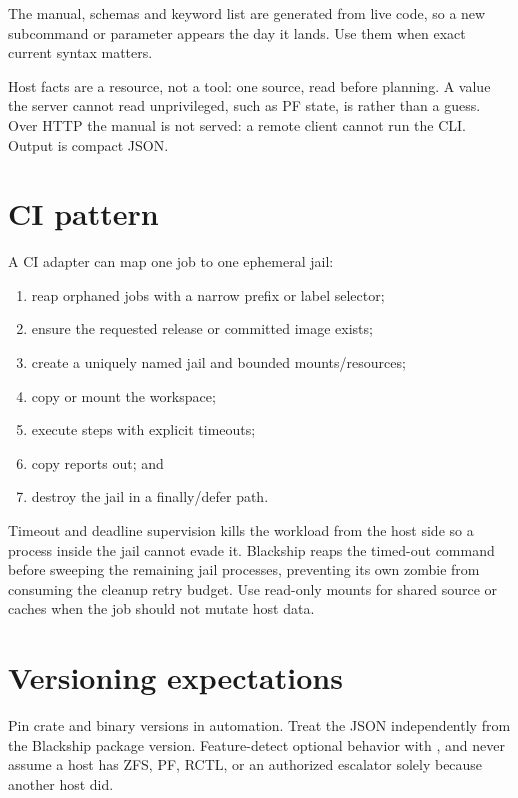 The manual, schemas and keyword list are generated from live code, so a new
subcommand or parameter appears the day it lands. Use them when exact current
syntax matters.

Host facts are a resource, not a tool: one source, read before planning. A
value the server cannot read unprivileged, such as PF state, is 
rather than a guess. Over HTTP the manual is not served: a remote client cannot
run the CLI. Output is compact JSON.

\section{CI pattern}

A CI adapter can map one job to one ephemeral jail:

\begin{enumerate}
  \item reap orphaned jobs with a narrow prefix or label selector;
  \item ensure the requested release or committed image exists;
  \item create a uniquely named jail and bounded mounts/resources;
  \item copy or mount the workspace;
  \item execute steps with explicit timeouts;
  \item copy reports out; and
  \item destroy the jail in a finally/defer path.
\end{enumerate}

Timeout and deadline supervision kills the workload from the host side so a
process inside the jail cannot evade it. Blackship reaps the timed-out command
before sweeping the remaining jail processes, preventing its own zombie from
consuming the cleanup retry budget. Use read-only mounts for shared source or
caches when the job should not mutate host data.

\section{Versioning expectations}

Pin crate and binary versions in automation. Treat the JSON
 independently from the Blackship package version.
Feature-detect optional behavior with , and never assume a
host has ZFS, PF, RCTL, or an authorized escalator solely because another host
did.
